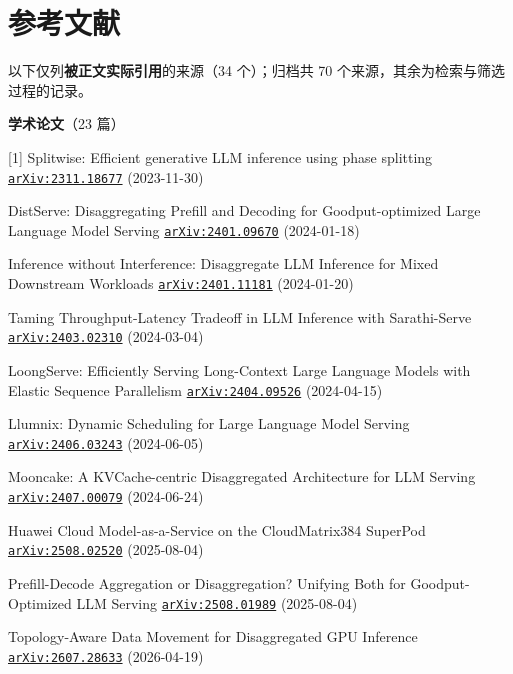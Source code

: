 \section*{参考文献}
\begingroup
\footnotesize
\setlength{\parindent}{0pt}
\setlength{\parskip}{2.5pt}

\noindent 以下仅列\textbf{被正文实际引用}的来源（34 个）；归档共 70 个来源，其余为检索与筛选过程的记录。\par
\vspace{4pt}
\noindent\textbf{学术论文}（23 篇）\par
\vspace{2pt}
[1] Splitwise: Efficient generative LLM inference using phase splitting \href{https://arxiv.org/abs/2311.18677}{\texttt{arXiv:2311.18677}} (2023-11-30)\par
[2] DistServe: Disaggregating Prefill and Decoding for Goodput-optimized Large Language Model Serving \href{https://arxiv.org/abs/2401.09670}{\texttt{arXiv:2401.09670}} (2024-01-18)\par
[3] Inference without Interference: Disaggregate LLM Inference for Mixed Downstream Workloads \href{https://arxiv.org/abs/2401.11181}{\texttt{arXiv:2401.11181}} (2024-01-20)\par
[4] Taming Throughput-Latency Tradeoff in LLM Inference with Sarathi-Serve \href{https://arxiv.org/abs/2403.02310}{\texttt{arXiv:2403.02310}} (2024-03-04)\par
[5] LoongServe: Efficiently Serving Long-Context Large Language Models with Elastic Sequence Parallelism \href{https://arxiv.org/abs/2404.09526}{\texttt{arXiv:2404.09526}} (2024-04-15)\par
[6] Llumnix: Dynamic Scheduling for Large Language Model Serving \href{https://arxiv.org/abs/2406.03243}{\texttt{arXiv:2406.03243}} (2024-06-05)\par
[7] Mooncake: A KVCache-centric Disaggregated Architecture for LLM Serving \href{https://arxiv.org/abs/2407.00079}{\texttt{arXiv:2407.00079}} (2024-06-24)\par
[8] Huawei Cloud Model-as-a-Service on the CloudMatrix384 SuperPod \href{https://arxiv.org/abs/2508.02520}{\texttt{arXiv:2508.02520}} (2025-08-04)\par
[9] Prefill-Decode Aggregation or Disaggregation? Unifying Both for Goodput-Optimized LLM Serving \href{https://arxiv.org/abs/2508.01989}{\texttt{arXiv:2508.01989}} (2025-08-04)\par
[10] Topology-Aware Data Movement for Disaggregated GPU Inference \href{https://arxiv.org/abs/2607.28633}{\texttt{arXiv:2607.28633}} (2026-04-19)\par

